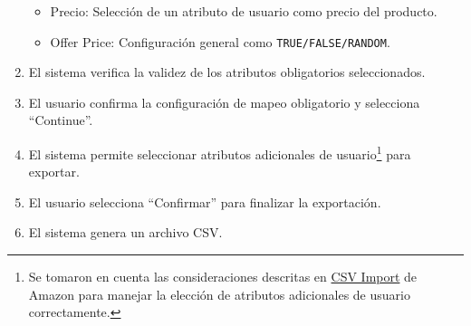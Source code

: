 \begin{enumerate}
\begin{itemize}
        \item Precio: Selección de un atributo de usuario como precio del producto.
        \item Offer Price: Configuración general como \texttt{TRUE/FALSE/RANDOM}.
    \end{itemize}
    \item El sistema verifica la validez de los atributos obligatorios seleccionados.
    \item El usuario confirma la configuración de mapeo obligatorio y selecciona \enquote{Continue}.
    \item El sistema permite seleccionar atributos adicionales de usuario\footnote{Se tomaron en cuenta las consideraciones descritas en \href{https://buywithprime.amazon.com/knowledge-center/csv-import?utm_medium=website\&utm_source=direct\#standalone-product}{CSV Import} de Amazon para manejar la elección de atributos adicionales de usuario correctamente.} para exportar.
    \item El usuario selecciona \enquote{Confirmar} para finalizar la exportación.
    \item El sistema genera un archivo CSV.
\end{enumerate}

